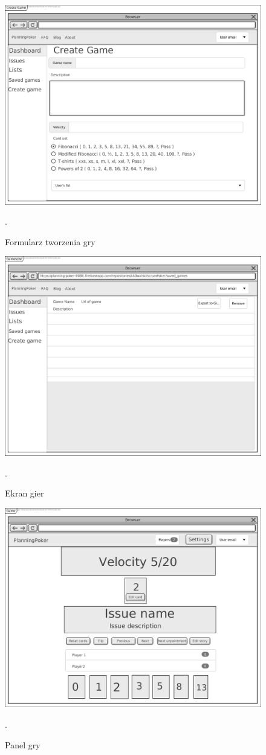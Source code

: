 \begin{figure}[h]
	\centering\includegraphics[width=.7\textwidth]{img/gameCreate}
	\caption{Formularz tworzenia gry}.
	\label{rys:gameCreate}
\end{figure}

\begin{figure}[h]
	\centering\includegraphics[width=.7\textwidth]{img/GamesList}
	\caption{Ekran gier}.
	\label{rys:GamesList}
\end{figure}

\begin{figure}[h]
	\centering\includegraphics[width=.7\textwidth]{img/GameScreen}
	\caption{Panel gry}.
	\label{rys:GameScreen}
\end{figure}


